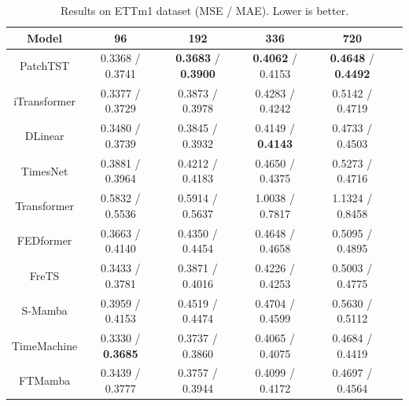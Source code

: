 \documentclass[electronics,article,submit,pdftex,moreauthors]{Definitions/mdpi}
\begin{document}
\begin{table}[H]
\caption{Results on ETTm1 dataset (MSE / MAE). Lower is better.\label{tab:ettm1}}
\begin{tabularx}{\textwidth}{CCCCCC}
\toprule
\textbf{Model} & \textbf{96} & \textbf{192} & \textbf{336} & \textbf{720} \\
\midrule
PatchTST      & 0.3368 / 0.3741  & \textbf{0.3683} / \textbf{0.3900}  & \textbf{0.4062} / 0.4153  & \textbf{0.4648} / \textbf{0.4492}  \\
iTransformer  & 0.3377 / 0.3729  & 0.3873 / 0.3978  & 0.4283 / 0.4242  & 0.5142 / 0.4719  \\
DLinear       & 0.3480 / 0.3739  & 0.3845 / 0.3932  & 0.4149 / \textbf{0.4143}  & 0.4733 / 0.4503  \\
TimesNet      & 0.3881 / 0.3964  & 0.4212 / 0.4183  & 0.4650 / 0.4375  & 0.5273 / 0.4716  \\
Transformer   & 0.5832 / 0.5536  & 0.5914 / 0.5637  & 1.0038 / 0.7817  & 1.1324 / 0.8458  \\
FEDformer     & 0.3663 / 0.4140  & 0.4350 / 0.4454  & 0.4648 / 0.4658  & 0.5095 / 0.4895  \\
FreTS         & 0.3433 / 0.3781  & 0.3871 / 0.4016  & 0.4226 / 0.4253  & 0.5003 / 0.4775  \\
S-Mamba       & 0.3959 / 0.4153  & 0.4519 / 0.4474  & 0.4704 / 0.4599  & 0.5630 / 0.5112  \\
TimeMachine   & 0.3330 / \textbf{0.3685}  & 0.3737 / 0.3860  & 0.4065 / 0.4075  & 0.4684 / 0.4419  \\
FTMamba       & 0.3439 / 0.3777  & 0.3757 / 0.3944  & 0.4099 / 0.4172  & 0.4697 / 0.4564  \\
\bottomrule
\end{tabularx}
\end{table}
\end{document}
